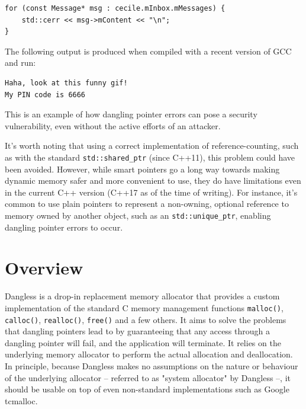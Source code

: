 \begin{lstlisting}
for (const Message* msg : cecile.mInbox.mMessages) {
	std::cerr << msg->mContent << "\n";
}
\end{lstlisting}

The following output is produced when compiled with a recent version of GCC and run:

\begin{verbatim}
Haha, look at this funny gif!	
My PIN code is 6666
\end{verbatim}

This is an example of how dangling pointer errors can pose a security vulnerability, even without the active efforts of an attacker.

It's worth noting that using a correct implementation of reference-counting, such as with the standard \lstinline!std::shared_ptr! (since C++11), this problem could have been avoided. However, while smart pointers go a long way towards making dynamic memory safer and more convenient to use, they do have limitations even in the current C++ version (C++17 as of the time of writing). For instance, it's common to use plain pointers to represent a non-owning, optional reference to memory owned by another object, such as an \lstinline!std::unique_ptr!, enabling dangling pointer errors to occur.

\section{Overview}


Dangless is a drop-in replacement memory allocator that provides a custom implementation of the standard C memory management functions \lstinline!malloc()!, \lstinline!calloc()!, \lstinline!realloc()!, \lstinline!free()! and a few others. It aims to solve the problems that dangling pointers lead to by guaranteeing that any access through a dangling pointer will fail, and the application will terminate. It relies on the underlying memory allocator to perform the actual allocation and deallocation. In principle, because Dangless makes no assumptions on the nature or behaviour of the underlying allocator -- referred to as "system allocator" by Dangless --, it should be usable on top of even non-standard implementations such as Google tcmalloc.

